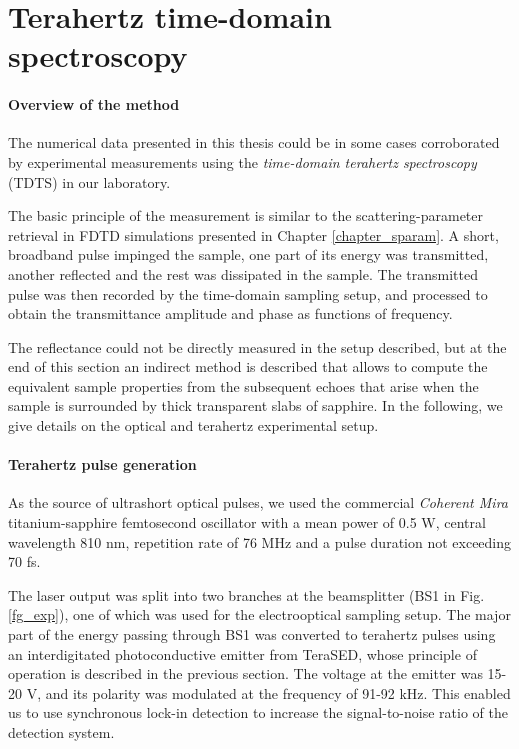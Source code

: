 
\section{Terahertz time-domain spectroscopy} \label{sect_tdts} 
\paragraph{Overview of the method}%
The numerical data presented in this thesis could be in some cases corroborated by experimental measurements using the \textit{time-domain terahertz spectroscopy} (TDTS) in our laboratory. 

The basic principle of the measurement is similar to the scattering-parameter retrieval in FDTD simulations presented in Chapter \ref{chapter_sparam}.
 A short, broadband pulse impinged the sample, one part of its energy was transmitted, another reflected and the rest was dissipated in the sample. The transmitted pulse was then recorded by the time-domain sampling setup, and processed to obtain the transmittance amplitude and phase as functions of frequency.

The reflectance could not be directly measured in the setup described, but at the end of this section an indirect method is described that allows to compute the equivalent sample properties from the subsequent echoes that arise when the sample is surrounded by thick transparent slabs of sapphire. 
In the following, we give details on the optical and terahertz experimental setup.
\paragraph{Terahertz pulse generation}%
As the source of ultrashort optical pulses, we used the commercial \textit{Coherent Mira} titanium-sapphire femtosecond oscillator with a mean power of 0.5 W, central wavelength 810 nm, repetition rate of 76 MHz and a pulse duration not exceeding 70 fs.  

The laser output was split into two branches at the beamsplitter (BS1 in Fig. \ref{fg_exp}), one of which was used for the electrooptical sampling setup. The major part of the energy passing through BS1 was converted to terahertz pulses using an interdigitated photoconductive emitter from TeraSED, whose principle of operation is described in the previous section. 
The voltage at the emitter was 15-20 V, and its polarity was modulated at the frequency of 91-92 kHz. This enabled us to use synchronous lock-in detection to increase the signal-to-noise ratio of the detection system. %

